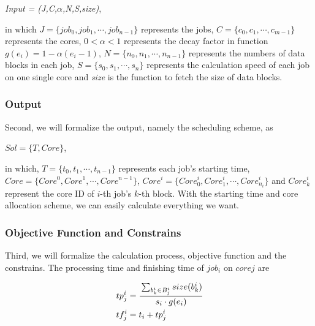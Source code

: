 \documentclass{article}
\begin{document}
        \begin{center}
            \textit{Input = (J,C,$\alpha$,N,S,size)},
        \end{center}
        
        in which $J=\{ job_0,job_1,\cdots,job_{n-1}\}$ represents the jobs, $C=\{ c_0,c_1,\cdots,c_{m-1}\}$ represents the cores, $0 < \alpha < 1$ represents the decay factor in function $g(e_i) = 1 - \alpha(e_i - 1)$, $N=\{n_0,n_1,\cdots,n_{n-1}\}$ represents the numbers of data blocks in each job, $S=\{s_0,s_1,\cdots,s_n\}$ represents the calculation speed of each job on one single core and \textit{size} is the function to fetch the size of data blocks.
        
    \subsubsection{Output}
        Second, we will formalize the output, namely the scheduling scheme, as
        
        \begin{center}
            $Sol = \{T,Core\}$,
        \end{center}
        
        in which, $T=\{t_0,t_1,\cdots,t_{n-1}\}$ represents each job's starting time,\\ $Core=\{Core^0,Core^1,\cdots,Core^{n-1}\}$, $Core^i = \{Core^i_0,Core^i_1,\cdots,Core^i_{n_{i}}\}$ and $Core^i_k$ represent the core ID of $i$-th job's $k$-th block. With the starting time and core allocation scheme, we can easily calculate everything we want.
        
    \subsubsection{Objective Function and Constrains}
        Third, we will formalize the calculation process, objective function and the constrains. The processing time and finishing time of $job_i$ on $core j$ are
        
        \begin{center}
        $$
        \begin{aligned}
            tp^i_j &= \cfrac{\sum_{b^i_k \in B^i_j} size(b^i_k)}{s_i \cdot g(e_i)}\\
            tf^i_j &= t_i + tp^i_j
        \end{aligned}
        $$
        \end{center}
        
\end{document}
